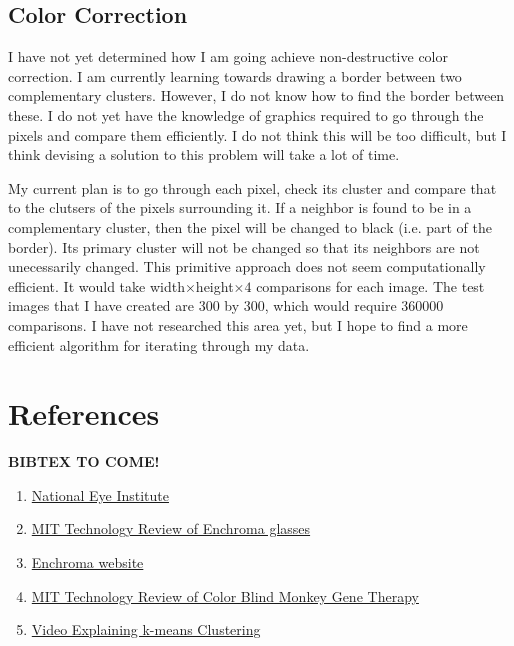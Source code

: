 \documentclass[12pt]{article}
\begin{document}
\subsection{Color Correction}
I have not yet determined how I am going achieve non-destructive color correction. I am currently learning towards drawing a border between two complementary clusters. However, I do not know how to find the border between these. I do not yet have the knowledge of graphics required to go through the pixels and compare them efficiently. I do not think this will be too difficult, but I think devising a solution to this problem will take a lot of time. 

My current plan is to go through each pixel, check its cluster and compare that to the clutsers of the pixels surrounding it. If a neighbor is found to be in a complementary cluster, then the pixel will be changed to black (i.e. part of the border). Its primary cluster will not be changed so that its neighbors are not unecessarily changed. This primitive approach does not seem computationally efficient. It would take width$\times$height$\times 4$ comparisons for each image. The test images that I have created are 300 by 300, which would require 360000 comparisons. I have not researched this area yet, but I hope to find a more efficient algorithm for iterating through my data.

\section{References}
\singlespacing
\textbf{BIBTEX TO COME!}
\begin{enumerate}
	\item 
		\href{https://nei.nih.gov/health/color_blindness/facts_about}{National Eye Institute}

	\item
		\href{https://www.technologyreview.com/s/601782/how-enchromas-glasses-correct-color-blindness/}{MIT Technology Review of Enchroma glasses}
	
	\item
		\href{http://enchroma.com/contact-us/}{Enchroma website}
		
	\item
		\href{https://www.technologyreview.com/s/415339/color-blind-monkeys-get-full-color-vision/}{MIT Technology Review of Color Blind Monkey Gene Therapy}
		
	\item
		\href{https://www.youtube.com/watch?v=IuRb3y8qKX4}{Video Explaining k-means Clustering}
		


\end{enumerate}
\end{document}

